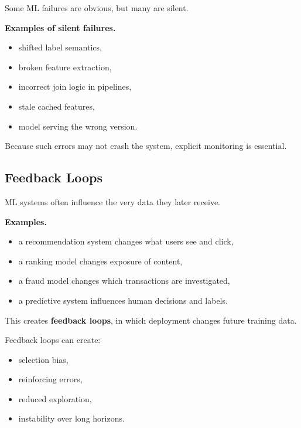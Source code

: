 Some ML failures are obvious, but many are silent.

\medskip

\noindent
\textbf{Examples of silent failures.}
\begin{itemize}
    \item shifted label semantics,
    \item broken feature extraction,
    \item incorrect join logic in pipelines,
    \item stale cached features,
    \item model serving the wrong version.
\end{itemize}

\medskip

\noindent
Because such errors may not crash the system, explicit monitoring is essential.

\subsection{Feedback Loops}

ML systems often influence the very data they later receive.

\medskip

\noindent
\textbf{Examples.}
\begin{itemize}
    \item a recommendation system changes what users see and click,
    \item a ranking model changes exposure of content,
    \item a fraud model changes which transactions are investigated,
    \item a predictive system influences human decisions and labels.
\end{itemize}

\medskip

\noindent
This creates \textbf{feedback loops}, in which deployment changes future training data.

\medskip

\noindent
Feedback loops can create:
\begin{itemize}
    \item selection bias,
    \item reinforcing errors,
    \item reduced exploration,
    \item instability over long horizons.
\end{itemize}

